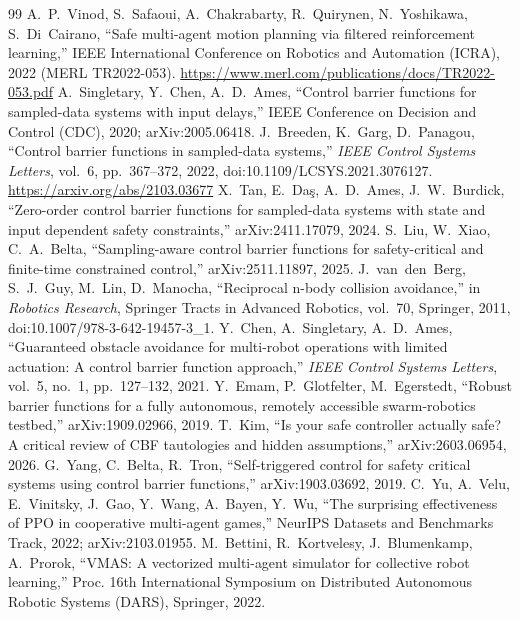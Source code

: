 \documentclass[journal]{IEEEtran}
\begin{document}
\begin{thebibliography}{99}
 A.~P.~Vinod, S.~Safaoui, A.~Chakrabarty, R.~Quirynen, N.~Yoshikawa, S.~Di~Cairano, ``Safe multi-agent motion planning via filtered reinforcement learning,'' IEEE International Conference on Robotics and Automation (ICRA), 2022 (MERL TR2022-053). \url{https://www.merl.com/publications/docs/TR2022-053.pdf}
 A.~Singletary, Y.~Chen, A.~D.~Ames, ``Control barrier functions for sampled-data systems with input delays,'' IEEE Conference on Decision and Control (CDC), 2020; arXiv:2005.06418.
 J.~Breeden, K.~Garg, D.~Panagou, ``Control barrier functions in sampled-data systems,'' \emph{IEEE Control Systems Letters}, vol.~6, pp.~367--372, 2022, doi:10.1109/LCSYS.2021.3076127. \url{https://arxiv.org/abs/2103.03677} 
 X.~Tan, E.~Da\c{s}, A.~D.~Ames, J.~W.~Burdick, ``Zero-order control barrier functions for sampled-data systems with state and input dependent safety constraints,'' arXiv:2411.17079, 2024.
 S.~Liu, W.~Xiao, C.~A.~Belta, ``Sampling-aware control barrier functions for safety-critical and finite-time constrained control,'' arXiv:2511.11897, 2025.
 J.~van~den~Berg, S.~J.~Guy, M.~Lin, D.~Manocha, ``Reciprocal n-body collision avoidance,'' in \emph{Robotics Research}, Springer Tracts in Advanced Robotics, vol.~70, Springer, 2011, doi:10.1007/978-3-642-19457-3\_1.
 Y.~Chen, A.~Singletary, A.~D.~Ames, ``Guaranteed obstacle avoidance for multi-robot operations with limited actuation: A control barrier function approach,'' \emph{IEEE Control Systems Letters}, vol.~5, no.~1, pp.~127--132, 2021.
 Y.~Emam, P.~Glotfelter, M.~Egerstedt, ``Robust barrier functions for a fully autonomous, remotely accessible swarm-robotics testbed,'' arXiv:1909.02966, 2019.
 T.~Kim, ``Is your safe controller actually safe? A critical review of CBF tautologies and hidden assumptions,'' arXiv:2603.06954, 2026.
 G.~Yang, C.~Belta, R.~Tron, ``Self-triggered control for safety critical systems using control barrier functions,'' arXiv:1903.03692, 2019.
 C.~Yu, A.~Velu, E.~Vinitsky, J.~Gao, Y.~Wang, A.~Bayen, Y.~Wu, ``The surprising effectiveness of PPO in cooperative multi-agent games,'' NeurIPS Datasets and Benchmarks Track, 2022; arXiv:2103.01955.
 M.~Bettini, R.~Kortvelesy, J.~Blumenkamp, A.~Prorok, ``VMAS: A vectorized multi-agent simulator for collective robot learning,'' Proc. 16th International Symposium on Distributed Autonomous Robotic Systems (DARS), Springer, 2022.

\end{thebibliography}
\end{document}
